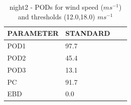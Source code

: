 \begin{table}[h!]
\begin{center}
\begin{tabular}{|l|l|l|l|}
\hline
\multicolumn{1}{|c|}{\cellcolor[HTML]{C0C0C0}\textbf{PARAMETER}} & \multicolumn{1}{c|}{\cellcolor[HTML]{C0C0C0}\textbf{STANDARD}} \\
\hline
\cellcolor[HTML]{C0C0C0}POD1  & 97.7   \\
\cellcolor[HTML]{C0C0C0}POD2  & 45.4   \\
\cellcolor[HTML]{C0C0C0}POD3  & 13.1   \\
\cellcolor[HTML]{C0C0C0}PC    & 91.7     \\
\cellcolor[HTML]{C0C0C0}EBD   & 0.0    \\
\hline
\end{tabular}
\caption{night2 - PODs for wind speed ($m s^{-1}$) and thresholds (12.0,18.0) $m s^{-1}$}
\label{tab:podwsFT:night2}
\end{center}
\end{table}

